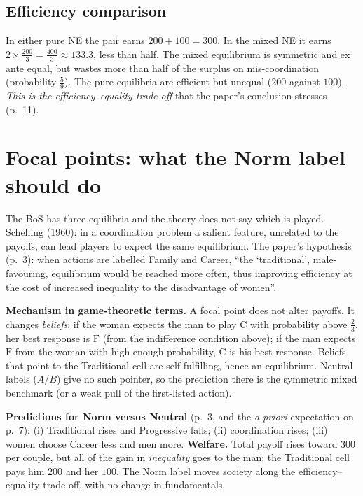 \documentclass[11pt,a4paper]{article}
\newcommand{\C}{\mathrm{C}}
\newcommand{\Fm}{\mathrm{F}}
\begin{document}
\subsection{Efficiency comparison}
In either pure NE the pair earns $200+100=300$. In the mixed NE it earns
$2\times\tfrac{200}{3}=\tfrac{400}{3}\approx133.3$, less than half. The mixed equilibrium is
symmetric and ex ante equal, but wastes more than half of the surplus on mis-coordination
(probability $\tfrac59$). The pure equilibria are efficient but unequal ($200$ against $100$).
\emph{This is the efficiency--equality trade-off} that the paper's conclusion stresses (p.~11).

\section{Focal points: what the Norm label should do}

The BoS has three equilibria and the theory does not say which is played. Schelling (1960): in a
coordination problem a salient feature, unrelated to the payoffs, can lead players to expect the
same equilibrium. The paper's hypothesis (p.~3): when actions are labelled Family and Career,
``the `traditional', male-favouring, equilibrium would be reached more often, thus improving
efficiency at the cost of increased inequality to the disadvantage of women''.

\textbf{Mechanism in game-theoretic terms.} A focal point does not alter payoffs. It changes
\emph{beliefs}: if the woman expects the man to play $\C$ with probability above $\tfrac23$, her best
response is $\Fm$ (from the indifference condition above); if the man expects $\Fm$ from the woman
with high enough probability, $\C$ is his best response. Beliefs that point to the Traditional cell
are self-fulfilling, hence an equilibrium. Neutral labels ($A$/$B$) give no such pointer, so the
prediction there is the symmetric mixed benchmark (or a weak pull of the first-listed action).

\textbf{Predictions for Norm versus Neutral} (p.~3, and the \emph{a priori} expectation on p.~7):
(i) Traditional rises and Progressive falls; (ii) coordination rises; (iii) women choose Career less
and men more. \textbf{Welfare.} Total payoff rises toward $300$ per couple, but all of the gain in
\emph{inequality} goes to the man: the Traditional cell pays him $200$ and her $100$. The Norm
label moves society along the efficiency--equality trade-off, with no change in fundamentals.
\end{document}
